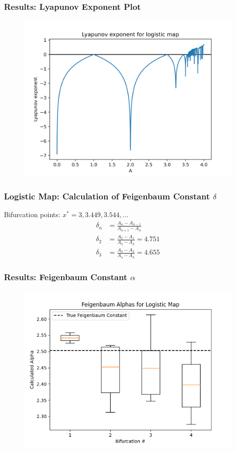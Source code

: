 \documentclass[
	11pt, %
	aspectratio=169, %
]{beamer}
\begin{document}
\begin{frame}
        \frametitle{Results: Lyapunov Exponent Plot}
    \begin{figure}
        \includegraphics[width=0.6\linewidth]{logistic_lyapunov_exp.png}
    \end{figure}
\end{frame}


\begin{frame}
        \frametitle{Logistic Map: Calculation of Feigenbaum Constant $\delta$}
        Bifurcation points: $x^* = 3, 3.449, 3.544, \dots$ \pause
        \begin{align*}
            \delta_{n} &= \frac{A_{n}-A_{n-1}}{A_{n+1}-A_{n}} \\
            \delta_{2} &= \frac{A_{2}-A_{1}}{A_{3}-A_{2}} = 4.751 \\
            \delta_{3} &= \frac{A_{3}-A_{2}}{A_{4}-A_{3}} = 4.655
        \end{align*}
\end{frame}


\begin{frame}
        \frametitle{Results: Feigenbaum Constant $\alpha$}
    \begin{figure}
        \includegraphics[width=0.6\linewidth]
        {logistic_feigenbaum_alphas.png}
    \end{figure}
\end{frame}
\end{document}
